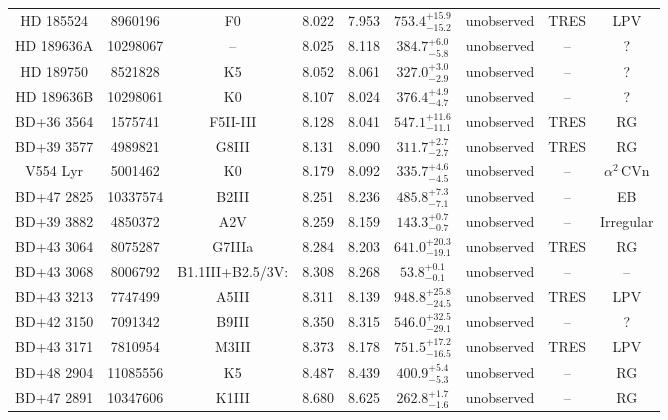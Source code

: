 \begin{table*}
\begin{tabular}{ccccccccc}
HD 185524 & 8960196 & F0 & 8.022 & 7.953 & $753.4^{+15.9}_{-15.2}$ & unobserved & TRES & LPV \\
HD 189636A & 10298067 & -- & 8.025 & 8.118 & $384.7^{+6.0}_{-5.8}$ & unobserved & -- & ? \\
HD 189750 & 8521828 & K5 & 8.052 & 8.061 & $327.0^{+3.0}_{-2.9}$ & unobserved & -- & ? \\
HD 189636B & 10298061 & K0 & 8.107 & 8.024 & $376.4^{+4.9}_{-4.7}$ & unobserved & -- & ? \\
BD+36 3564 & 1575741 & F5II-III & 8.128 & 8.041 & $547.1^{+11.6}_{-11.1}$ & unobserved & TRES & RG \\
BD+39 3577 & 4989821 & G8III & 8.131 & 8.090 & $311.7^{+2.7}_{-2.7}$ & unobserved & TRES & RG \\
V554 Lyr & 5001462 & K0 & 8.179 & 8.092 & $335.7^{+4.6}_{-4.5}$ & unobserved & -- & $\alpha^2\,\text{CVn}$ \\
BD+47 2825 & 10337574 & B2III & 8.251 & 8.236 & $485.8^{+7.3}_{-7.1}$ & unobserved & -- & EB \\
BD+39 3882 & 4850372 & A2V & 8.259 & 8.159 & $143.3^{+0.7}_{-0.7}$ & unobserved & -- & Irregular \\
BD+43 3064 & 8075287 & G7IIIa & 8.284 & 8.203 & $641.0^{+20.3}_{-19.1}$ & unobserved & TRES & RG \\
BD+43 3068 & 8006792 & B1.1III+B2.5/3V: & 8.308 & 8.268 & $53.8^{+0.1}_{-0.1}$ & unobserved & -- & -- \\
BD+43 3213 & 7747499 & A5III & 8.311 & 8.139 & $948.8^{+25.8}_{-24.5}$ & unobserved & TRES & LPV \\
BD+42 3150 & 7091342 & B9III & 8.350 & 8.315 & $546.0^{+32.5}_{-29.1}$ & unobserved & -- & ? \\
BD+43 3171 & 7810954 & M3III & 8.373 & 8.178 & $751.5^{+17.2}_{-16.5}$ & unobserved & TRES & LPV \\
BD+48 2904 & 11085556 & K5 & 8.487 & 8.439 & $400.9^{+5.4}_{-5.3}$ & unobserved & -- & RG \\
BD+47 2891 & 10347606 & K1III & 8.680 & 8.625 & $262.8^{+1.7}_{-1.6}$ & unobserved & -- & RG \\
\hline
\end{tabular}
\end{table*}
